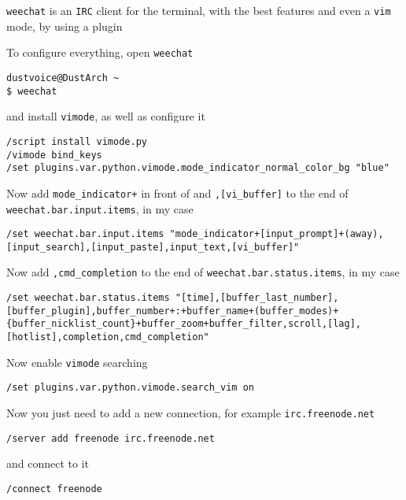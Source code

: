 \documentclass[10pt]{dustdoc}
\begin{document}
\texttt{weechat} is an \texttt{IRC} client for the terminal, with the best features and even a \texttt{vim} mode, by using a plugin

To configure everything, open \texttt{weechat}

\begin{verbatim}
dustvoice@DustArch ~
$ weechat
\end{verbatim}

\noindent
and install \texttt{vimode}, as well as configure it

\begin{verbatim}
/script install vimode.py
/vimode bind_keys
/set plugins.var.python.vimode.mode_indicator_normal_color_bg "blue"
\end{verbatim}

Now add \texttt{mode_indicator+} in front of and \texttt{,[vi_buffer]} to the end of \texttt{weechat.bar.input.items}, in my case

\begin{verbatim}
/set weechat.bar.input.items "mode_indicator+[input_prompt]+(away),[input_search],[input_paste],input_text,[vi_buffer]"
\end{verbatim}

Now add \texttt{,cmd_completion} to the end of \texttt{weechat.bar.status.items}, in my case

\begin{verbatim}
/set weechat.bar.status.items "[time],[buffer_last_number],[buffer_plugin],buffer_number+:+buffer_name+(buffer_modes)+{buffer_nicklist_count}+buffer_zoom+buffer_filter,scroll,[lag],[hotlist],completion,cmd_completion"
\end{verbatim}

Now enable \texttt{vimode} searching

\begin{verbatim}
/set plugins.var.python.vimode.search_vim on
\end{verbatim}

Now you just need to add a new connection, for example \texttt{irc.freenode.net}

\begin{verbatim}
/server add freenode irc.freenode.net
\end{verbatim}

\noindent
and connect to it

\begin{verbatim}
/connect freenode
\end{verbatim}
\end{document}
